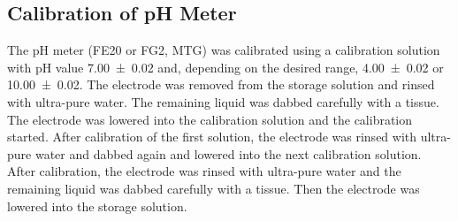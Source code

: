 \subsection{Calibration of pH Meter\label{subsec-ph-calib}}
The pH meter (FE20 or FG2, MTG) was calibrated using a calibration solution with pH value \num{7.00(2)} and, depending on the desired range, \num{4.00(2)} or \num{10.00(2)}. The electrode was removed from the storage solution and rinsed with ultra-pure water. The remaining liquid was dabbed carefully with a tissue. The electrode was lowered into the calibration solution and the calibration started. After calibration of the first solution, the electrode was rinsed with ultra-pure water and dabbed again and lowered into the next calibration solution. After calibration, the electrode was rinsed with ultra-pure water and the remaining liquid was dabbed carefully with a tissue. Then the electrode was lowered into the storage solution.

